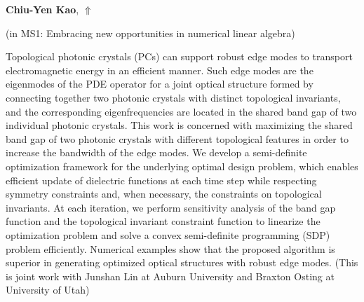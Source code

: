 \documentclass[ILAS2025-program.tex]{subfiles}
\begin{document}
\hypertarget{down0348}{}\begin{ilasabstract}
    
\textbf{Chiu-Yen Kao},  \hfill \hyperlink{up0348}{$\Uparrow$}
    
    
(in {\color{mstitle}MS1: Embracing new opportunities in numerical linear algebra})
        
\mtskip
    Topological photonic crystals (PCs) can support robust edge modes to transport electromagnetic energy in an efficient manner. Such edge modes are the eigenmodes of the PDE operator for a joint optical structure formed by connecting together two photonic crystals with distinct topological invariants, and the corresponding eigenfrequencies are located in the shared band gap of two individual photonic crystals. This work is concerned with maximizing the shared band gap of two photonic crystals with different topological features in order to increase the bandwidth of the edge modes. We develop a semi-definite optimization framework for the underlying optimal design problem, which enables efficient update of dielectric functions at each time step while respecting symmetry constraints and, when necessary, the constraints on topological invariants. At each iteration, we perform sensitivity analysis 
of the band gap function and the topological invariant constraint function to linearize the optimization problem and solve a convex semi-definite programming (SDP) problem efficiently. Numerical examples show that the proposed algorithm is superior in generating optimized optical structures with robust edge modes. (This is joint work with Junshan Lin at Auburn University and Braxton Osting at University of Utah)
\end{ilasabstract}
    
\end{document}
